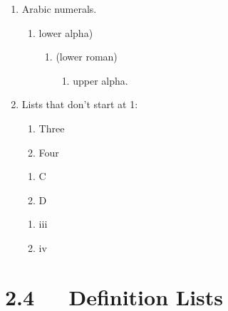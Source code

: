 \documentclass[a4paper]{memoir}
\newcounter{enumv}
\begin{document}
\begin{enumerate}
\item Arabic numerals.

\begin{enumerate}
\renewcommand{\labelenumii}{\alph{enumii})}
\item lower alpha)

\begin{enumerate}
\renewcommand{\labelenumiii}{(\roman{enumiii})}
\item (lower roman)

\begin{enumerate}
\item upper alpha.

\end{enumerate}
\end{enumerate}
\end{enumerate}

\item Lists that don't start at 1:

\begin{enumerate}
\renewcommand{\labelenumii}{\arabic{enumii}.}
\setcounter{enumii}{2}
\item Three

\item Four
\end{enumerate}

\begin{enumerate}
\renewcommand{\labelenumii}{\Alph{enumii}.}
\setcounter{enumii}{2}
\item C

\item D
\end{enumerate}

\begin{enumerate}
\renewcommand{\labelenumii}{\roman{enumii}.}
\setcounter{enumii}{2}
\item iii

\item iv
\end{enumerate}
\end{enumerate}


\section{2.4   Definition Lists}
\end{document}

